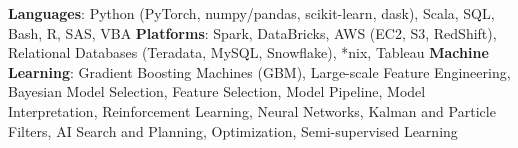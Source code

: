 

\begin{cvparagraph}
{\textbf{Languages}: Python (PyTorch, numpy/pandas, scikit-learn, dask), Scala, SQL, Bash, R, SAS, VBA}\newline
{\textbf{Platforms}: Spark, DataBricks, AWS (EC2, S3, RedShift), Relational Databases (Teradata, MySQL, Snowflake), *nix, Tableau}\newline
{\textbf{Machine Learning}: Gradient Boosting Machines (GBM), Large-scale Feature Engineering, Bayesian Model Selection, Feature Selection, Model Pipeline, Model Interpretation, Reinforcement Learning, Neural Networks, Kalman and Particle Filters, AI Search and Planning, Optimization, Semi-supervised Learning}
\end{cvparagraph}
